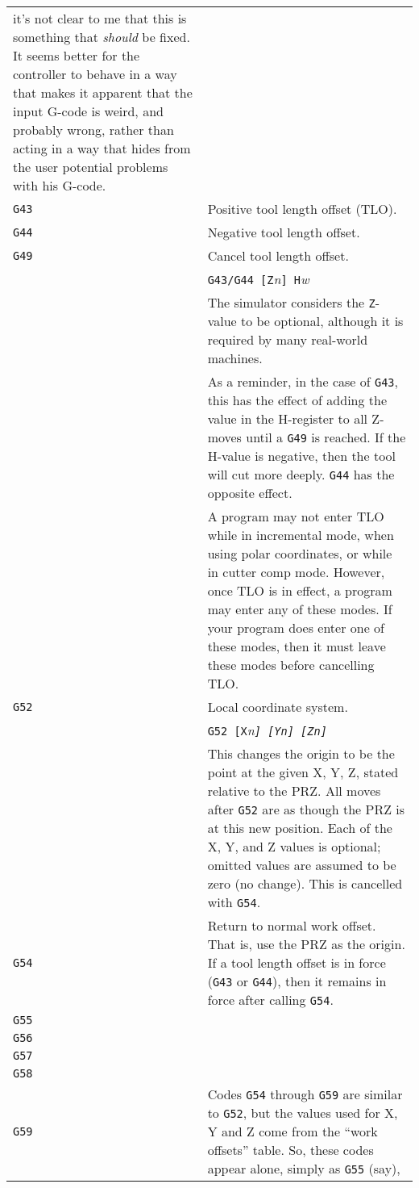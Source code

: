 \documentclass[titlepage,oneside,10pt]{article}
\begin{document}
\begin{longtable}{lp{10cm}}
it's not clear to me that this is something that \emph{should} be
fixed. It seems better for the controller to behave in a way that
makes it apparent that the input G-code is weird, and probably wrong, rather
than acting in a way that hides from the user potential problems with his
G-code. \\
{\tt G43}&Positive tool length offset (TLO).\\
{\tt G44}&Negative tool length offset.\\
{\tt G49}&Cancel tool length offset.\\
&{\tt G43/G44 [Z}\emph{n}{\tt ] H}\emph{w}\\
& The simulator considers the {\tt Z}-value to be
optional, although it is required by many real-world machines. \\
& As a reminder, in the case of {\tt G43}, this has the effect
of adding the value in the H-register to all Z-moves until a {\tt G49}
is reached. If the H-value is negative, then the tool will cut more
deeply. {\tt G44} has the opposite effect.\\
&A program may not enter TLO while in incremental mode, when using
polar coordinates, or while in cutter comp mode. However, once TLO is
in effect, a program may enter any of these modes. If your program
does enter one of these modes, then it must leave these modes before
cancelling TLO. \\
{\tt G52}&Local coordinate system.\\
& {\tt G52 [X}\em{n}\tt{]} \tt{[Y}\em{n}\tt{]} \tt{[Z}\em{n}\tt{]} \\
& This changes the origin to be the point at the given X, Y, Z, stated
relative to the PRZ. All moves after {\tt G52} are as though the PRZ
is at this new position. Each of the X, Y, and Z values is optional;
omitted values are assumed to be zero (no change). This is cancelled
with {\tt G54}. \\
{\tt G54}& Return to normal work offset. That is, use the PRZ as the
origin. If a tool length offset is in force ({\tt G43} or {\tt G44}),
then it remains in force after calling {\tt G54}.\\
{\tt G55}&\\
{\tt G56}&\\
{\tt G57}&\\
{\tt G58}&\\
{\tt G59}&Codes {\tt G54} through {\tt G59} are similar to {\tt G52},
but the values used for X, Y and Z come from the ``work offsets''
table. So, these codes appear alone, simply as {\tt G55} (say),

\end{longtable}
\end{document}
